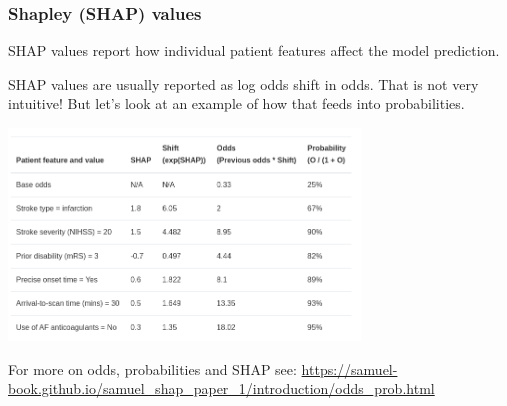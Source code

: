 \documentclass[xcolor={usenames,dvipsnames}]{beamer}
\newcommand{\smallurl}[1]{\textcolor{blue}{\fontsize{4pt}{4.8pt}\selectfont \url{#1}}}
\begin{document}
\begin{frame}
\frametitle{Shapley (SHAP) values}

{\footnotesize
SHAP values report how individual patient features affect the model prediction. 
\vspace{0.5em}

SHAP values are usually reported as log odds shift in odds. That is not very intuitive! 
But let’s look at an example of how that feeds into probabilities.
} 

\begin{center} 
\includegraphics[width=0.7\textwidth]{./images/SHAP_values_table}
\end{center} 

{\tiny For more on odds, probabilities and SHAP see: }
\smallurl{https://samuel-book.github.io/samuel_shap_paper_1/introduction/odds_prob.html}

\end{frame}



\end{document}
